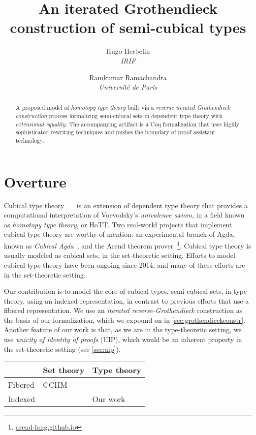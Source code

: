 \documentclass[10pt]{art}
\title{An iterated Grothendieck construction of semi-cubical types}
\author{
  \textcolor{gray80}{Hugo Herbelin} \\
  \itshape \textcolor{gray80}{IRIF}
  \and
  \textcolor{gray80}{Ramkumar Ramachandra} \\
  \itshape \textcolor{gray80}{Université de Paris}
}
\date{}
\begin{document}
\thispagestyle{empty}
\maketitle
\begin{abstract}
  A proposed model of \emph{homotopy type theory} built via a \emph{reverse iterated Grothendieck construction} process formalizing semi-cubical sets in dependent type theory with \emph{extensional equality}. The accompanying artifact is a Coq formalization that uses highly sophisticated rewriting techniques and pushes the boundary of proof assistant technology.
\end{abstract}
\tableofcontents
\newpage

\section{Overture}
Cubical type theory~\cite{Bezem14}~\cite{Cohen16}~\cite{Angiuli17} is an extension of dependent type theory that provides a computational interpretation of Voevodsky's \emph{univalence axiom}, in a field known as \emph{homotopy type theory}, or HoTT. Two real-world projects that implement cubical type theory are worthy of mention: an experimental branch of Agda, known as \emph{Cubical Agda}~\cite{Vezzosi21}, and the Arend theorem prover~\footnote{\href{https://arend-lang.github.io}{arend-lang.github.io}}. Cubical type theory is usually modeled as cubical sets, in the set-theoretic setting. Efforts to model cubical type theory have been ongoing since 2014, and many of these efforts are in the set-theoretic setting.

Our contribution is to model the core of cubical types, semi-cubical sets, in type theory, using an indexed representation, in contrast to previous efforts that use a fibered representation. We use an \emph{iterated reverse-Grothendieck} construction as the basis of our formalization, which we expound on in \ref{sec:grothendieckconstr}. Another feature of our work is that, as we are in the type-theoretic setting, we use \emph{unicity of identity of proofs} (UIP), which would be an inherent property in the set-theoretic setting (see \ref{sec:uip}).

\begin{table}[H]
  \begin{tabularx}{\linewidth}{p{.3\linewidth}|p{.3\linewidth}|p{.3\linewidth}}
    \toprule
            & Set theory & Type theory \\
    \midrule
    Fibered & CCHM       &             \\
    \midrule
    Indexed &            & Our work    \\
    \bottomrule
  \end{tabularx}
\end{table}
\end{document}

